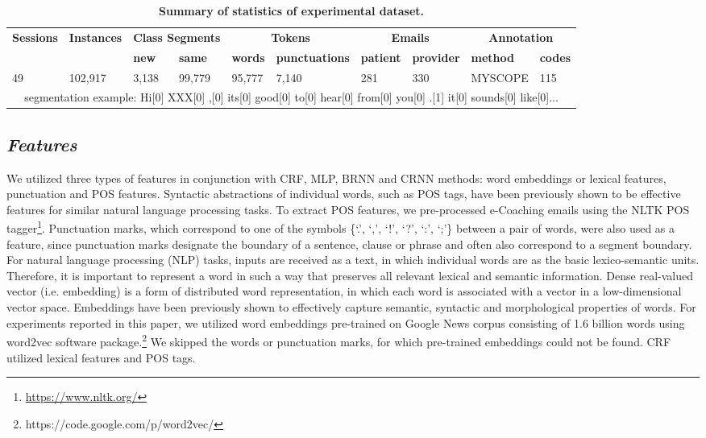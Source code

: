 \documentclass{amia}
\begin{document}
\begin{table}[ht]
\centering
\caption{\textbf{Summary of statistics of experimental dataset.}}
\label{tab:datastat}
 \begin{tabular}{|l|l|l|l|l|l|l|l|l|l|}
  \hline
   \multirow{2}{*}{\textbf{Sessions}} & \multirow{2}{*}{\textbf{Instances}} & \multicolumn{2}{|c|}{\textbf{Class Segments}} & \multicolumn{2}{|c|}{\textbf{Tokens}} & \multicolumn{2}{|c|}{\textbf{Emails}} & \multicolumn{2}{|c|}{\textbf{Annotation}} \\\cline{3-10}
   &  & \textbf{new}  & \textbf{same} & \textbf{words} & \textbf{punctuations}  & \textbf{patient} & \textbf{provider} & \textbf{method}  & \textbf{codes} \\ \hline    
 49 & 102,917 & 3,138 & 99,779 & 95,777 & 7,140 & 281 & 330 & MYSCOPE & 115 \\ \hline
 \multicolumn{10}{|c|}{segmentation example: Hi[0] XXX[0] ,[0] its[0] good[0] to[0] hear[0] from[0] you[0] .[1] it[0] sounds[0] like[0]...} \\ \hline
  \end{tabular}
\end{table}     

\subsection*{\textit{Features}}
We utilized three types of features in conjunction with CRF, MLP, BRNN and CRNN methods: word embeddings or lexical features, punctuation and POS features. Syntactic abstractions of individual words, such as POS tags, have been previously shown to be effective features for similar natural language processing tasks.\cite{liu2005using,treviso2017sentence} To extract POS features, we pre-processed e-Coaching emails using the NLTK POS tagger\footnote{\url{https://www.nltk.org/}}. Punctuation marks, which correspond to one of the symbols \{`.', `,', `!', `?', `:', `;'\} between a pair of words, were also used as a feature, since punctuation marks designate the boundary of a sentence, clause or phrase and often also correspond to a segment boundary.\cite{cho2002text} For natural language processing (NLP) tasks, inputs are received as a text, in which individual words are as the basic lexico-semantic units. Therefore, it is important to represent a word in such a way that preserves all relevant lexical and semantic information. Dense real-valued vector (i.e. embedding) is a form of distributed word representation, in which each word is associated with a vector in a low-dimensional vector space. Embeddings have been previously shown to effectively capture semantic, syntactic and morphological properties of words.\cite{pennington2014glove, mikolov2013distributed} For experiments reported in this paper, we utilized word embeddings pre-trained on Google News corpus consisting of 1.6 billion words using word2vec software package.\footnote{\label{fn:word2vec}https://code.google.com/p/word2vec/} We skipped the words or punctuation marks, for which pre-trained embeddings could not be found. CRF utilized lexical features and POS tags. 
\end{document}
